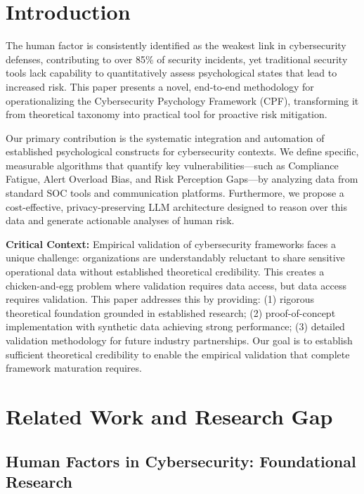 \documentclass[11pt, a4paper]{article}
\begin{document}
\vspace{1cm}

\section{Introduction}
\label{sec:introduction}

The human factor is consistently identified as the weakest link in cybersecurity defenses, contributing to over 85\% of security incidents\cite{verizon2023}, yet traditional security tools lack capability to quantitatively assess psychological states that lead to increased risk. This paper presents a novel, end-to-end methodology for operationalizing the Cybersecurity Psychology Framework (CPF)\cite{canale2024cpf}, transforming it from theoretical taxonomy into practical tool for proactive risk mitigation.

Our primary contribution is the systematic integration and automation of established psychological constructs for cybersecurity contexts. We define specific, measurable algorithms that quantify key vulnerabilities—such as Compliance Fatigue, Alert Overload Bias, and Risk Perception Gaps—by analyzing data from standard SOC tools and communication platforms. Furthermore, we propose a cost-effective, privacy-preserving LLM architecture designed to reason over this data and generate actionable analyses of human risk.

\textbf{Critical Context:} Empirical validation of cybersecurity frameworks faces a unique challenge: organizations are understandably reluctant to share sensitive operational data without established theoretical credibility. This creates a chicken-and-egg problem where validation requires data access, but data access requires validation. This paper addresses this by providing: (1) rigorous theoretical foundation grounded in established research; (2) proof-of-concept implementation with synthetic data achieving strong performance; (3) detailed validation methodology for future industry partnerships. Our goal is to establish sufficient theoretical credibility to enable the empirical validation that complete framework maturation requires.

\section{Related Work and Research Gap}
\label{sec:related}

\subsection{Human Factors in Cybersecurity: Foundational Research}
\end{document}
